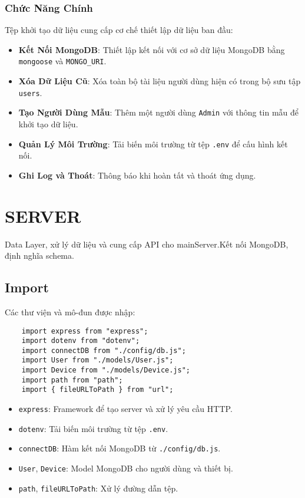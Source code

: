             \subsubsection{Chức Năng Chính}
                \hspace*{0.6cm}Tệp khởi tạo dữ liệu cung cấp cơ chế thiết lập dữ liệu ban đầu:
                \begin{itemize}
                    \item \textbf{Kết Nối MongoDB}: Thiết lập kết nối với cơ sở dữ liệu MongoDB bằng \texttt{mongoose} và \texttt{MONGO\_URI}.
                    \item \textbf{Xóa Dữ Liệu Cũ}: Xóa toàn bộ tài liệu người dùng hiện có trong bộ sưu tập \texttt{users}.
                    \item \textbf{Tạo Người Dùng Mẫu}: Thêm một người dùng \texttt{Admin} với thông tin mẫu để khởi tạo dữ liệu.
                    \item \textbf{Quản Lý Môi Trường}: Tải biến môi trường từ tệp \texttt{.env} để cấu hình kết nối.
                    \item \textbf{Ghi Log và Thoát}: Thông báo khi hoàn tất và thoát ứng dụng.
                \end{itemize}
    \section{SERVER}
        \hspace*{0.6cm}Data Layer, xử lý dữ liệu và cung cấp API cho mainServer.Kết nối MongoDB, định nghĩa schema.
        \subsection{Import}
            \hspace*{0.6cm}Các thư viện và mô-đun được nhập:
            \begin{lstlisting}
    import express from "express";
    import dotenv from "dotenv";
    import connectDB from "./config/db.js";
    import User from "./models/User.js";
    import Device from "./models/Device.js";
    import path from "path";
    import { fileURLToPath } from "url";
            \end{lstlisting}
            \begin{itemize}
                \item \texttt{express}: Framework để tạo server và xử lý yêu cầu HTTP.
                \item \texttt{dotenv}: Tải biến môi trường từ tệp \texttt{.env}.
                \item \texttt{connectDB}: Hàm kết nối MongoDB từ \texttt{./config/db.js}.
                \item \texttt{User}, \texttt{Device}: Model MongoDB cho người dùng và thiết bị.
                \item \texttt{path}, \texttt{fileURLToPath}: Xử lý đường dẫn tệp.
            \end{itemize}

